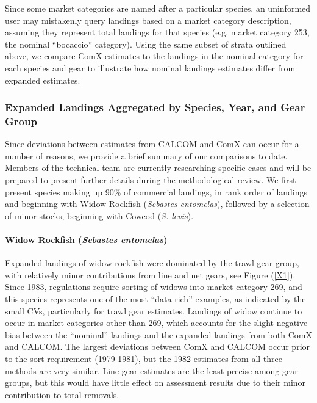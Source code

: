 \documentclass[12pt]{article}
\begin{document}
Since some market categories are named after a particular species, an 
uninformed user may mistakenly query landings based on a market category 
description, assuming they represent total landings for that species 
(e.g. market category 253, the nominal ``bocaccio'' category). Using the same 
subset of strata outlined above, we compare ComX estimates to the landings in 
the nominal category for each species and gear to illustrate how nominal 
landings estimates differ from expanded estimates.

\subsubsection{Expanded Landings Aggregated by Species, Year, and Gear Group}

%
Since deviations between estimates from CALCOM and ComX can occur for a number 
of reasons, we provide a brief summary of our comparisons to date. Members of 
the technical team are currently researching specific cases and will be 
prepared to present further details during the methodological review. We first 
present species making up 90\% of commercial landings, in rank order of 
landings and beginning with Widow Rockfish (\textit{Sebastes entomelas}), 
followed by a selection of minor stocks, beginning with Cowcod 
(\textit{S. levis}).

\paragraph{Widow Rockfish (\textit{Sebastes entomelas})}

Expanded landings of widow rockfish were dominated by the trawl gear group, 
with relatively minor contributions from line and net gears, see 
Figure (\ref{X1}). Since 1983, regulations require sorting of widows into 
market category 269, and this species represents one of the most ``data-rich'' 
examples, as indicated by the small CVs, particularly for trawl gear 
estimates. Landings of widow continue to occur in market categories other than 
269, which accounts for the slight negative bias between the ``nominal'' 
landings and the expanded landings from both ComX and CALCOM. The largest 
deviations between ComX and CALCOM occur prior to the sort requirement 
(1979-1981), but the 1982 estimates from all three methods are very similar. 
Line gear estimates are the least precise among gear groups, but this would 
have little effect on assessment results due to their minor contribution to 
total removals.
\end{document}
